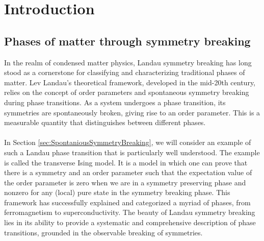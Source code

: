 \chapter{Introduction}\label{ch:introduction}
\section{Phases of matter through symmetry breaking}
In the realm of condensed matter physics, Landau symmetry breaking has long stood as a cornerstone for classifying and characterizing traditional phases of matter. Lev Landau's theoretical framework, developed in the mid-20th century, relies on the concept of order parameters and spontaneous symmetry breaking during phase transitions. As a system undergoes a phase transition, its symmetries are spontaneously broken, giving rise to an order parameter. This is a measurable quantity that distinguishes between different phases.
\\\\
In Section \ref{sec:SpontaniousSymmetryBreaking}, we will consider an example of such a Landau phase transition that is particularly well understood. The example is called the transverse Ising model. It is a model in which one can prove that there is a symmetry and an order parameter such that the expectation value of the order parameter is zero when we are in a symmetry preserving phase and nonzero for any (local) pure state in the symmetry breaking phase. This framework has successfully explained and categorized a myriad of phases, from ferromagnetism to superconductivity. The beauty of Landau symmetry breaking lies in its ability to provide a systematic and comprehensive description of phase transitions, grounded in the observable breaking of symmetries.
